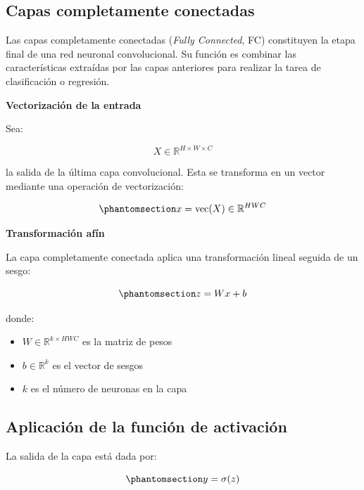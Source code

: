 \documentclass[
  spanish,
  us-letterpaper,
  DIV=11,
  numbers=noendperiod]{scrreprt}
\providecommand{\tightlist}{%
  \setlength{\itemsep}{0pt}\setlength{\parskip}{0pt}}
\begin{document}
\subsection{Capas completamente
conectadas}\label{capas-completamente-conectadas}

Las capas completamente conectadas (\emph{Fully Connected}, FC)
constituyen la etapa final de una red neuronal convolucional. Su función
es combinar las características extraídas por las capas anteriores para
realizar la tarea de clasificación o regresión.

\textbf{Vectorización de la entrada}

Sea:

\[
X \in \mathbb{R}^{H \times W \times C}
\]

la salida de la última capa convolucional. Esta se transforma en un
vector mediante una operación de vectorización:

\begin{equation}\phantomsection\label{eq-vectorizacion-fc}{
x = \mathrm{vec}(X) \in \mathbb{R}^{HWC}
}\end{equation}

\textbf{Transformación afín}

La capa completamente conectada aplica una transformación lineal seguida
de un sesgo:

\begin{equation}\phantomsection\label{eq-fc-lineal}{
z = Wx + b
}\end{equation}

donde:

\begin{itemize}
\tightlist
\item
  \(W \in \mathbb{R}^{k \times HWC}\) es la matriz de pesos\\
\item
  \(b \in \mathbb{R}^{k}\) es el vector de sesgos\\
\item
  \(k\) es el número de neuronas en la capa
\end{itemize}

\subsection{Aplicación de la función de
activación}\label{aplicaciuxf3n-de-la-funciuxf3n-de-activaciuxf3n}

La salida de la capa está dada por:

\begin{equation}\phantomsection\label{eq-fc-activacion}{
y = \sigma(z)
}\end{equation}
\end{document}
